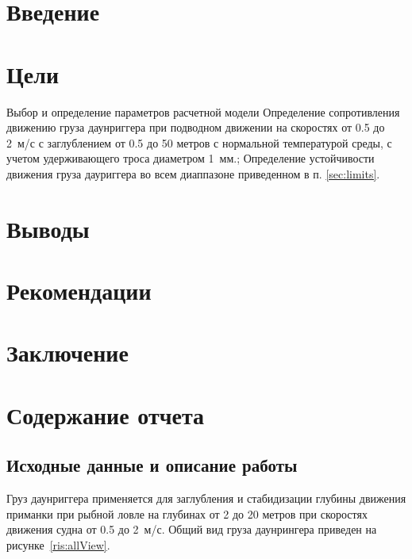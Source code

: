 \documentclass[russian,utf8, pointsubsection]{eskdtext}
\begin{document}



\tableofcontents

\newpage
\section{Введение}
\section{Цели}
\pointsection Выбор и определение параметров расчетной модели
\pointsection \label{sec:limits} Определение сопротивления движению груза даунриггера при подводном движении на скоростях от 0.5 до 2~м/с с заглублением от 0.5 до 50 метров с нормальной температурой среды, с учетом удерживающего троса диаметром 1~мм.;
\pointsection Определение устойчивости движения груза дауриггера во всем диаппазоне приведенном в п. \ref{sec:limits}.

\section{Выводы}
\section{Рекомендации}
\section{Заключение}
\section{Содержание отчета}
\subsection{Исходные данные и описание работы}
Груз даунриггера применяется для заглубления и стабидизации глубины движения приманки при рыбной ловле на глубинах от 2 до 20 метров при скоростях движения судна  от 0.5 до 2~м/с. Общий вид груза даунрингера приведен на рисунке~\ref{ris:allView}.
\end{document}
